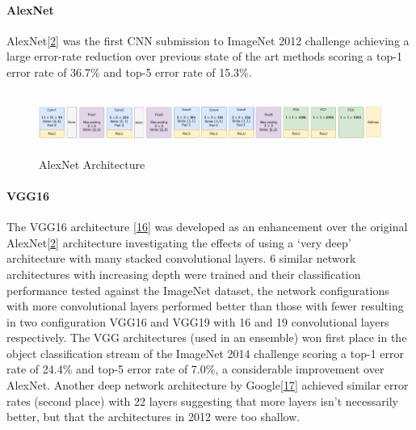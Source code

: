 \documentclass[A4paper,draft]{scrreprt}
\let\oldparagraph\paragraph
\renewcommand{\paragraph}[1]{\oldparagraph{#1}\mbox{}}
\begin{document}
\paragraph{AlexNet}\label{alexnet}

AlexNet{[}\protect\hyperlink{ref-krizhevsky2012_Imagenetclassificationdeep}{2}{]}
was the first CNN submission to ImageNet 2012 challenge achieving a
large error-rate reduction over previous state of the art methods
scoring a top-1 error rate of 36.7\% and top-5 error rate of 15.3\%.

\begin{figure}
\centering
\includegraphics[height=2.00000cm]{media/images/alexnet.pdf}
\caption{AlexNet Architecture}\label{fig:architecture:alexnet}
\end{figure}

\paragraph{VGG16}\label{vgg16}

The VGG16 architecture
{[}\protect\hyperlink{ref-simonyan2014_VeryDeepConvolutional}{16}{]} was
developed as an enhancement over the original
AlexNet{[}\protect\hyperlink{ref-krizhevsky2012_Imagenetclassificationdeep}{2}{]}
architecture investigating the effects of using a `very deep'
architecture with many stacked convolutional layers. 6 similar network
architectures with increasing depth were trained and their
classification performance tested against the ImageNet dataset, the
network configurations with more convolutional layers performed better
than those with fewer resulting in two configuration VGG16 and VGG19
with 16 and 19 convolutional layers respectively. The VGG architectures
(used in an ensemble) won first place in the object classification
stream of the ImageNet 2014 challenge scoring a top-1 error rate of
24.4\% and top-5 error rate of 7.0\%, a considerable improvement over
AlexNet. Another deep network architecture by
Google{[}\protect\hyperlink{ref-szegedy2014_GoingDeeperConvolutions}{17}{]}
achieved similar error rates (second place) with 22 layers suggesting
that more layers isn't necessarily better, but that the architectures in
2012 were too shallow.
\end{document}
